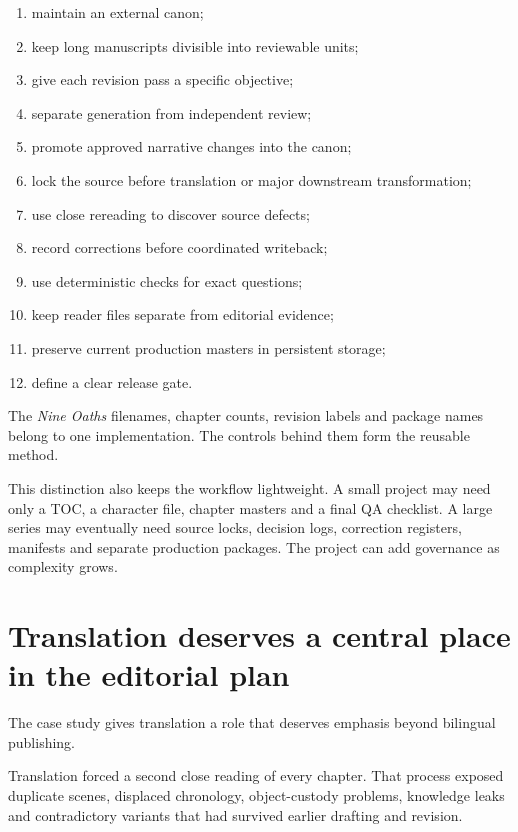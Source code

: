 \documentclass[11pt,oneside,openany]{book}
\providecommand{\tightlist}{%
  \setlength{\itemsep}{0pt}\setlength{\parskip}{0pt}}
\begin{document}
\begin{enumerate}
\def\labelenumi{\arabic{enumi}.}
\tightlist
\item
  maintain an external canon;
\item
  keep long manuscripts divisible into reviewable units;
\item
  give each revision pass a specific objective;
\item
  separate generation from independent review;
\item
  promote approved narrative changes into the canon;
\item
  lock the source before translation or major downstream transformation;
\item
  use close rereading to discover source defects;
\item
  record corrections before coordinated writeback;
\item
  use deterministic checks for exact questions;
\item
  keep reader files separate from editorial evidence;
\item
  preserve current production masters in persistent storage;
\item
  define a clear release gate.
\end{enumerate}

The \emph{Nine Oaths} filenames, chapter counts, revision labels and package names belong to one implementation. The controls behind them form the reusable method.

This distinction also keeps the workflow lightweight. A small project may need only a TOC, a character file, chapter masters and a final QA checklist. A large series may eventually need source locks, decision logs, correction registers, manifests and separate production packages. The project can add governance as complexity grows.

\chapter{Translation deserves a central place in the editorial plan}\label{translation-deserves-a-central-place-in-the-editorial-plan}

The case study gives translation a role that deserves emphasis beyond bilingual publishing.

Translation forced a second close reading of every chapter. That process exposed duplicate scenes, displaced chronology, object-custody problems, knowledge leaks and contradictory variants that had survived earlier drafting and revision.
\end{document}
